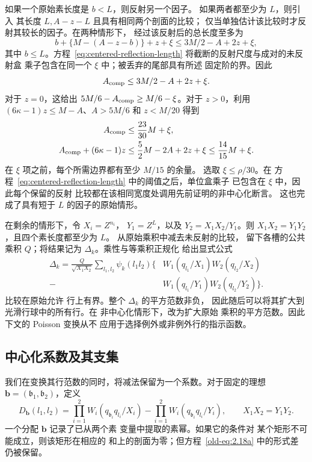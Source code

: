 如果一个原始素长度是 \(b<L\)，则反射另一个因子。
如果两者都至少为 \(L\)，则引入
其长度 \(L,A-z-L\) 且具有相同两个剖面的比较；
仅当单独估计该比较时才反射其较长的因子。在两种情形下，
经过该反射后的总长度至多为
\[
 b+\{M-(A-z-b)\}+z+\xi
 \le 3M/2-A+2z+\xi,
\]
其中 \(b\le L\)。方程~\eqref{eq:centered-reflection-length}
将截断的反射尺度与成对的未反射盒
乘子包含在同一个 \(\xi\) 中；被丢弃的尾部具有所述
固定阶的界。因此
\begin{equation}
 A_{\rm comp}\le3M/2-A+2z+\xi.
 \label{old-eq:3.11}
\end{equation}
对于 \(z=0\)，这给出
\(5M/6-A_{\rm comp}\ge M/6-\xi\)。对于 \(z>0\)，利用
\((6\kappa-1)z\le M-A\)、\(A>5M/6\) 和 \(z<M/20\) 得到
\begin{equation}
 \begin{aligned}
 A_{\rm comp}&\le\frac{23}{30}M+\xi,\\
 A_{\rm comp}+(6\kappa-1)z
 &\le\frac52M-2A+2z+\xi\le\frac{14}{15}M+\xi.
 \end{aligned}
 \label{eq:comparison-uncentered-margin}
\end{equation}
在 \(\xi\) 项之前，每个所需边界都有至少 \(M/15\) 的余量。
选取 \(\xi\le\rho/30\)。在
方程~\eqref{eq:centered-reflection-length} 中的阈值之后，单位盒乘子
已包含在 \(\xi\) 中，因此每个保留的反射
比较都在该相同宽度处调用先前证明的非中心化断言。
这也完成了具有短于 \(L\) 的因子的原始情形。

在剩余的情形下，令 \(X_i=Z^{n_i}\)，
\(Y_1=Z^L\)，以及 \(Y_2=X_1X_2/Y_1\)。则
\(X_1X_2=Y_1Y_2\)，且四个素长度都至少为 \(L\)。
从原始乘积中减去未反射的比较，
留下各槽的公共乘积 \(Q\)；将结果记为
\(\Delta_k\)。乘性与等乘积正规化
给出显式公式
\[
 \begin{split}
 \Delta_k
 =\frac{Q}{\sqrt{X_1X_2}}\sum_{l_1,l_2}\psi_k(l_1l_2)
 \bigl\{
 &W_1(q_{l_1}/X_1)W_2(q_{l_2}/X_2)\\
 -{}&W_1(q_{l_1}/Y_1)W_2(q_{l_2}/Y_2)
 \bigr\}.
 \end{split}
\]
比较在原始允许
行上有界。整个 \(\Delta_k\) 的平方范数非负，
因此随后可以将其扩大到光滑行球中的所有行。在
非中心化情形下，改为扩大原始
乘积的平方范数。因此下文的 Poisson 变换从不
应用于选择例外或非例外行的指示函数。

\subsection{中心化系数及其支集}

我们在变换其行范数的同时，将减法保留为一个系数。对于固定的理想
\(\mathbf b=(\mathfrak b_1,\mathfrak b_2)\)，定义
\begin{equation}
 D_{\mathbf b}(l_1,l_2)
 =
 \prod_{i=1}^2W_i(q_{\mathfrak b_i}q_{l_i}/X_i)
 -
 \prod_{i=1}^2W_i(q_{\mathfrak b_i}q_{l_i}/Y_i),
 \qquad X_1X_2=Y_1Y_2.
 \label{old-eq:2.18a}
\end{equation}
一个分配 \(\mathbf b\) 记录了已从两个素
变量中提取的素幂。如果它的条件对
某个矩形不可能成立，则该矩形在相应的
和上的剖面为零；但方程~\eqref{old-eq:2.18a} 中的形式差
仍被保留。

